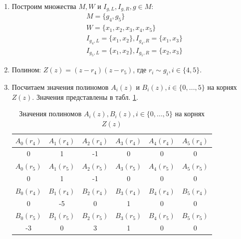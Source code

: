 \documentclass[12pt, a4paper]{extarticle}
\begin{document}
\begin{enumerate}
    \item Построим множества $M, W$ и $I_{g, L}, I_{g, R}, g \in M$:
        \begin{equation*}
            \begin{split}
                & M = \{g_4, g_5\} \\
                & W = \{x_1, x_2, x_3, x_4, x_5\} \\
                & I_{g_4, L} = \{x_1, x_2\}, I_{g_4, R} = \{x_1, x_3\} \\
                & I_{g_5, L} = \{x_1, x_2\}, I_{g_5, R} = \{x_2, x_3\}
            \end{split}
        \end{equation*}
        
    \item Полином: $Z(z) = (z - r_4)(z - r_5)$, где $r_i \sim g_i, i \in \{4, 5\}$.
    
    \item Посчитаем значения полиномов $A_i(z)$ и $B_i(z), i \in \{0, ..., 5\}$ на корнях $Z(z)$.
        Значения представлены в табл. \ref{ab-values}.
        
        \begin{table}[h]
            \centering
            \caption{Значения полиномов $A_i(z), B_i(z), i \in \{0, ..., 5\}$ на корнях $Z(z)$}
            \label{ab-values}
            \begin{tabular}{|c|c|c|c|c|c|}
                \hline
                $A_0(r_4)$ & $A_1(r_4)$ & $A_2(r_4)$ & $A_3(r_4)$ & $A_4(r_4)$ & $A_5(r_4)$ \\
                \hline 
                0 & 1 & -1 & 0 & 0 & 0 \\
                \hline 
                $A_0(r_5)$ & $A_1(r_5)$ & $A_2(r_5)$ & $A_3(r_5)$ & $A_4(r_5)$ & $A_5(r_5)$ \\
                \hline 
                0 & 1 & -1 & 0 & 0 & 0 \\
                \hline 
                $B_0(r_4)$ & $B_1(r_4)$ & $B_2(r_4)$ & $B_3(r_4)$ & $B_4(r_4)$ & $B_5(r_4)$ \\
                \hline 
                0  & -5 & 0 & 1 & 0 & 0 \\
                \hline 
                $B_0(r_5)$ & $B_1(r_5)$ & $B_2(r_5)$ & $B_3(r_5)$ & $B_4(r_5)$ & $B_5(r_5)$ \\
                \hline 
                -3 & 0  & 3 & 1 & 0 & 0 \\
                \hline 
            \end{tabular}
        \end{table}
    

\end{enumerate}
\end{document}
